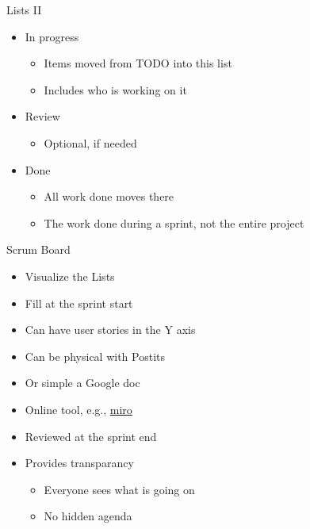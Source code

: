 \begin{frame}[fragile]{Lists II}
\begin{itemize}
\item In progress
\begin{itemize}
\item Items moved from TODO into this list
\item Includes who is working on it
\end{itemize}
\item Review
\begin{itemize}
\item Optional, if needed
\end{itemize}
\item Done
\begin{itemize}
\item All work done moves there
\item The work done during a sprint, not the entire project
\end{itemize}
\end{itemize}
\end{frame}

\begin{frame}[fragile]{Scrum Board}
\begin{itemize}
\item Visualize the Lists
\item Fill at the sprint start
\item Can have user stories in the Y axis
\item Can be physical with Postits
\item Or simple a Google doc
\item Online tool, e.g., \href{https://miro.com/agile/scrum-board/}{miro}
\item Reviewed at the sprint end
\item Provides transparancy
\begin{itemize}
\item Everyone sees what is going on
\item No hidden agenda
\end{itemize}
\end{itemize}
\end{frame}


